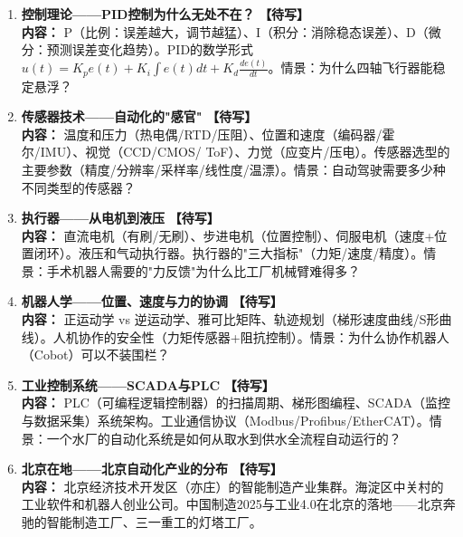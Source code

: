 \documentclass[a4paper,11pt]{ctexart}
\newcommand{\draft}{\textcolor{orange!80!black}{\textbf{【待写】}}}
\begin{document}
\begin{enumerate}
\item[\textbf{第1课}] \textbf{控制理论——PID控制为什么无处不在？} \draft \\
\textbf{内容：} P（比例：误差越大，调节越猛）、I（积分：消除稳态误差）、D（微分：预测误差变化趋势）。PID的数学形式 $u(t) = K_pe(t) + K_i\int e(t)dt + K_d\frac{de(t)}{dt}$。情景：为什么四轴飞行器能稳定悬浮？
\item[\textbf{第2课}] \textbf{传感器技术——自动化的"感官"} \draft \\
\textbf{内容：} 温度和压力（热电偶/RTD/压阻）、位置和速度（编码器/霍尔/IMU）、视觉（CCD/CMOS/ ToF）、力觉（应变片/压电）。传感器选型的主要参数（精度/分辨率/采样率/线性度/温漂）。情景：自动驾驶需要多少种不同类型的传感器？
\item[\textbf{第3课}] \textbf{执行器——从电机到液压} \draft \\
\textbf{内容：} 直流电机（有刷/无刷）、步进电机（位置控制）、伺服电机（速度+位置闭环）。液压和气动执行器。执行器的"三大指标"（力矩/速度/精度）。情景：手术机器人需要的"力反馈"为什么比工厂机械臂难得多？
\item[\textbf{第4课}] \textbf{机器人学——位置、速度与力的协调} \draft \\
\textbf{内容：} 正运动学 vs 逆运动学、雅可比矩阵、轨迹规划（梯形速度曲线/S形曲线）。人机协作的安全性（力矩传感器+阻抗控制）。情景：为什么协作机器人（Cobot）可以不装围栏？
\item[\textbf{第5课}] \textbf{工业控制系统——SCADA与PLC} \draft \\
\textbf{内容：} PLC（可编程逻辑控制器）的扫描周期、梯形图编程、SCADA（监控与数据采集）系统架构。工业通信协议（Modbus/Profibus/EtherCAT）。情景：一个水厂的自动化系统是如何从取水到供水全流程自动运行的？
\item[\textbf{第6课}] \textbf{北京在地——北京自动化产业的分布} \draft \\
\textbf{内容：} 北京经济技术开发区（亦庄）的智能制造产业集群。海淀区中关村的工业软件和机器人创业公司。中国制造2025与工业4.0在北京的落地——北京奔驰的智能制造工厂、三一重工的灯塔工厂。
\end{enumerate}
\end{document}
